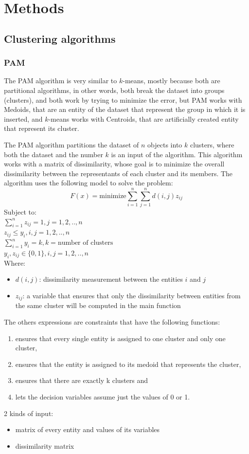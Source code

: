 \section{Methods}
\subsection{Clustering algorithms}
\subsubsection{PAM} %
The PAM algorithm is very similar to \(k\)-means, mostly because both are partitional algorithms, in other words, both break the dataset into groups (clusters), and both work by trying to minimize the error, but PAM works with Medoids, that are an entity of the dataset that represent the group in which it is inserted, and \(k\)-means works with Centroids, that are artificially created entity that represent its cluster.

The PAM algorithm partitions the dataset of \(n\) objects into \(k\) clusters, where both the dataset and the number \(k\) is an input of the algorithm. This algorithm works with a matrix of dissimilarity, whose goal is to minimize the overall dissimilarity between the representants of each cluster and its members. The algorithm uses the following model to solve the problem:
\[F(x) = \text{minimize} \sum_{i=1}^{n} \sum_{j=1}^{n} d(i,j) z_{ij}\]
Subject to:\\
\(\sum_{i=1}^n z_{ij} = 1, j=1,2,..,n\)\\
\(z_{ij} \leq y_{i}, i,j = 1,2,..,n\)\\
\(\sum_{i=1}^n y_{i} = k, k = \text{number of clusters}\)\\
\(y_{i}, z_{ij} \in \{0,1\} , i,j = 1,2,..,n\)\\
Where:
\begin{itemize}
    \item \(d(i,j)\): dissimilarity measurement between the entities \(i\) and \(j\)
    \item \(z_{ij}\): a variable that ensures that only the dissimilarity between entities from the same cluster will be computed in the main function
\end{itemize}
The others expressions are constraints that have the following functions: 
\begin{enumerate}
    \item ensures that every single entity is assigned to one cluster and only one cluster, 
    \item ensures that the entity is assigned to its medoid that represents the cluster, 
    \item ensures that there are exactly k clusters and 
    \item lets the decision variables assume just the values of 0 or 1. 
\end{enumerate}
2 kinds of input:
\begin{itemize}
    \item matrix of every entity and values of its variables
    \item dissimilarity matrix
\end{itemize}

